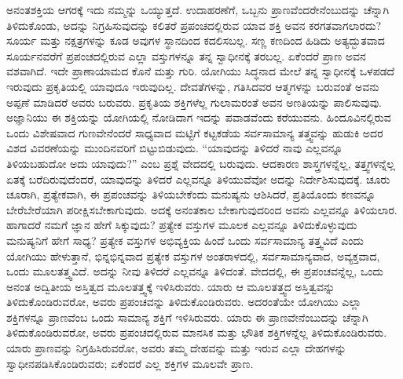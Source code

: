 ಅನಂತಶಕ್ತಿಯ ಆಗರಕ್ಕೆ ಇದು ನಮ್ಮನ್ನು ಒಯ್ಯುತ್ತದೆ. ಉದಾಹರಣೆಗೆ, ಒಬ್ಬನು ಪ್ರಾಣವೆಂದರೇನೆಂಬುದನ್ನು ಚೆನ್ನಾಗಿ ತಿಳಿದುಕೊಂಡು, ಅದನ್ನು ನಿಗ್ರಹಿಸುವುದನ್ನು ಕಲಿತರೆ ಪ್ರಪಂಚದಲ್ಲಿರುವ ಯಾವ ಶಕ್ತಿ ಅವನ ಕರಗತವಾಗಲಾರದು? ಸೂರ್ಯ ಮತ್ತು ನಕ್ಷತ್ರಗಳನ್ನು ಕೂಡ ಅವುಗಳ ಸ್ಥಾನದಿಂದ ಕದಲಿಸಬಲ್ಲ. ಸಣ್ಣ ಕಣದಿಂದ ಹಿಡಿದು ಅತ್ಯದ್ಭುತವಾದ ಸೂರ್ಯನವರೆಗೆ ಪ್ರಪಂಚದಲ್ಲಿರುವ ಎಲ್ಲಾ ವಸ್ತುಗಳನ್ನೂ ತನ್ನ ಸ್ವಾಧೀನಕ್ಕೆ ತರಬಲ್ಲ. ಏಕೆಂದರೆ ಪ್ರಾಣ ಅವನ ವಶವಾಗಿದೆ. ಇದೇ ಪ್ರಾಣಾಯಾಮದ ಕೊನೆ ಮತ್ತು ಗುರಿ. ಯೋಗಿಯು ಸಿದ್ಧನಾದ ಮೇಲೆ ತನ್ನ ಸ್ವಾಧೀನಕ್ಕೆ ಒಳಪಡದೆ ಇರುವುದು ಪ್ರಕೃತಿಯಲ್ಲಿ ಯಾವುದೂ ಇರುವುದಿಲ್ಲ. ದೇವತೆಗಳನ್ನು, ಗತಿಸಿದವರ ಆತ್ಮಗಳನ್ನು ಬರುವಂತೆ ಅವನು ಅಪ್ಪಣೆ ಮಾಡಿದರೆ ಅವರು ಬರುವರು. ಪ್ರಕೃತಿಯ ಶಕ್ತಿಗಳೆಲ್ಲ ಗುಲಾಮರಂತೆ ಅವನ ಅಣತಿಯನ್ನು ಪಾಲಿಸುವುವು. ಅಜ್ಞಾನಿಯು ಈ ಶಕ್ತಿಯನ್ನು ಯೋಗಿಯಲ್ಲಿ ನೋಡಿದಾಗ ಇದನ್ನು ಪವಾಡವೆಂದು ಕರೆಯುವನು. ಹಿಂದೂವಿನಲ್ಲಿರುವ ಒಂದು ವಿಶೇಷವಾದ ಗುಣವೇನೆಂದರೆ ಸಾಧ್ಯವಾದ ಮಟ್ಟಿಗೆ ಕಟ್ಟಕಡೆಯ ಸರ್ವಸಾಮಾನ್ಯ ತತ್ತ್ವವನ್ನು ಹುಡುಕಿ ಅದರ ವಿಶದ ವಿವರಣೆಯನ್ನು ಮುಂದಿನವರಿಗೆ ಬಿಟ್ಟುಬಿಡುವುದು. “ಯಾವುದನ್ನು ತಿಳಿದರೆ ನಾವು ಎಲ್ಲವನ್ನೂ ತಿಳಿಯಬಹುದೋ ಅದು ಯಾವುದು?” ಎಂಬ ಪ್ರಶ್ನೆ ವೇದದಲ್ಲಿ ಬರುವುದು. ಆದಕಾರಣ ಶಾಸ್ತ್ರಗಳನ್ನೆಲ್ಲ, ತತ್ತ್ವಗಳನ್ನೆಲ್ಲ ಏತಕ್ಕೆ ಬರೆದಿರುವುದೆಂದರೆ, ಯಾವುದನ್ನು ತಿಳಿದರೆ ಎಲ್ಲವನ್ನೂ ತಿಳಿಯುವೆವೋ ಅದನ್ನು ನಿರ್ದೇಶಿಸುವುದಕ್ಕೆ. ಚೂರು ಚೂರಾಗಿ, ಪ್ರತ್ಯೇಕವಾಗಿ, ಈ ಪ್ರಪಂಚವನ್ನು ತಿಳಿಯಬೇಕೆಂದು ಮನುಷ್ಯನು ಆಶಿಸಿದರೆ, ಪ್ರತಿಯೊಂದು ಕಣವನ್ನೂ ಬೇರೆಬೇರೆಯಾಗಿ ಪರೀಕ್ಷಿಸಬೇಕಾಗುವುದು. ಅದಕ್ಕೆ ಅನಂತಕಾಲ ಬೇಕಾಗುವುದರಿಂದ ಅವನು ಎಲ್ಲವನ್ನೂ ತಿಳಿಯಲಾರ. ಹಾಗಾದರೆ ನಮಗೆ ಜ್ಞಾನ ಹೇಗೆ ಸಿಕ್ಕುವುದು? ಪ್ರತ್ಯೇಕ ವಸ್ತುಗಳ ಮೂಲಕ ಎಲ್ಲವನ್ನೂ ತಿಳಿದುಕೊಳ್ಳುವುದು ಮನುಷ್ಯನಿಗೆ ಹೇಗೆ ಸಾಧ್ಯ? ಪ್ರತ್ಯೇಕ ವಸ್ತುಗಳ ಅಭಿವ್ಯಕ್ತಿಯ ಹಿಂದೆ ಒಂದು ಸರ್ವಸಾಮಾನ್ಯ ತತ್ತ್ವವಿದೆ ಎಂದು ಯೋಗಿಯು ಹೇಳುತ್ತಾನೆ, ಭಿನ್ನಭಿನ್ನವಾದ ಪ್ರತ್ಯೇಕ ವಸ್ತುಗಳ ಅಂತರಾಳದಲ್ಲಿ, ಸರ್ವಸಾಮಾನ್ಯವಾದ, ಅವ್ಯಕ್ತವಾದ, ಒಂದು ಮೂಲತತ್ತ್ವವಿದೆ. ಅದನ್ನು ನೀವು ತಿಳಿದರೆ ಎಲ್ಲವನ್ನೂ ತಿಳಿದಂತೆ. ವೇದದಲ್ಲಿ, ಈ ಪ್ರಪಂಚವನ್ನೆಲ್ಲ, ಒಂದು ಅನಂತ ಅದ್ವಿತೀಯ ಅಸ್ತಿತ್ವದ ಮೂಲತತ್ತ್ವಕ್ಕೆ ಇಳಿಸಿರುವರು. ಯಾರು ಆ ಮೂಲತತ್ತ್ವದ ಅಸ್ತಿತ್ವವನ್ನು ತಿಳಿದುಕೊಂಡಿರುವರೋ, ಅವರು ಪ್ರಪಂಚವನ್ನು ತಿಳಿದುಕೊಂಡಿರುವರು. ಅದರಂತೆಯೇ ಯೋಗಿಯು ಎಲ್ಲಾ ಶಕ್ತಿಗಳನ್ನೂ ಪ್ರಾಣವೆಂಬ ಒಂದು ಸಾಮಾನ್ಯ ಶಕ್ತಿಗೆ ಇಳಿಸಿರುವರು. ಯಾರು ಈ ಪ್ರಾಣವೇನೆಂಬುದನ್ನು ಚೆನ್ನಾಗಿ ತಿಳಿದುಕೊಂಡಿರುವರೋ, ಅವರು ಪ್ರಪಂಚದಲ್ಲಿರುವ ಮಾನಸಿಕ ಮತ್ತು ಭೌತಿಕ ಶಕ್ತಿಗಳನ್ನೆಲ್ಲ ತಿಳಿದುಕೊಂಡಿರುವರು. ಯಾರು ಪ್ರಾಣವನ್ನು ನಿಗ್ರಹಿಸಿರುವರೋ, ಅವರು ತಮ್ಮ ದೇಹವನ್ನು ಮತ್ತು ಇರುವ ಎಲ್ಲಾ ದೇಹಗಳನ್ನು ಸ್ವಾಧೀನಪಡಿಸಿಕೊಂಡಿರುವರು; ಏಕೆಂದರೆ ಎಲ್ಲ ಶಕ್ತಿಗಳ ಮೂಲವೇ ಪ್ರಾಣ. 

\vskip 0.2cm

